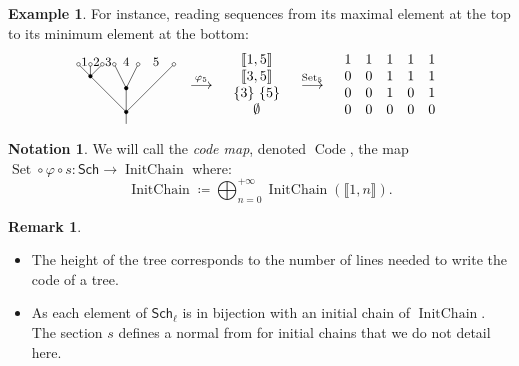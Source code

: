 \documentclass[a4paper,10pt]{amsart}
\DeclareMathOperator{\IC}{InitChain}
\DeclareMathOperator{\Code}{Code}
\DeclareMathOperator{\Set}{Set}
\newcommand\Sch{\mathsf{Sch}}
\newcommand\Schl{\mathsf{Sch}_\ell}
\newcommand{\IEM}[2]{\llbracket #1,#2 \rrbracket}
\theoremstyle{definition}
\newtheorem{exam}{Example}
\newtheorem{Not}{Notation}
\newtheorem{Rq}{Remark}
\begin{document}
\begin{exam}\label{Eg:tree_code}
	For instance, reading sequences from its maximal element at the top to its minimum element at the bottom:
	\begin{align}
		\raisebox{-0.5\height}{\begin{tikzpicture}[x=0.3cm, y=0.3cm]
				\draw (0,0)--(0,1);
				\draw (0,1)--(-4,5);
				\draw (0,1)--(4,5);
				\draw (0,1)--(0,3);
				\draw (0,3)--(-1,5);
				\draw (0,3)--(1,5);
				\draw (-3,4)--(-2,5);
				\draw (-3,4)--(-3,5);
				\filldraw (0,1) circle (0.15);
				\draw[ color=black, fill=white]  (-4,5) circle (0.15);
				\draw[ color=black, fill=white]  (-3,5) circle (0.15);
				\draw[ color=black, fill=white]  (-2,5) circle (0.15);
				\draw[ color=black, fill=white]  (-1,5) circle (0.15);
				\draw[ color=black, fill=white]  (4,5) circle (0.15);
				\draw[ color=black, fill=white]  (1,5) circle (0.15);
				\filldraw (-3,4) circle (0.15);
				\filldraw (0,3) circle (0.15);		
				\draw (-3.5, 5.2) node{\small{$1$}};
				\draw (-2.5, 5.2) node{\small{$2$}};
				\draw (-1.5,5.2) node{\small{$3$}};
				\draw (0, 5.2) node{\small{$4$}};
				\draw (2.5, 5.2) node{\small{$5$}};
		\end{tikzpicture}} && \overset{\varphi_5}{\longrightarrow} && \begin{array}{c}
			\IEM{1}{5} \\
			\IEM{3}{5} \\
			\{3\}~\{5\} \\
			\emptyset
		\end{array}
		&& \overset{\Set_5}{\longrightarrow} &&  \begin{array}{ccccc}
			1 & 1 & 1 & 1 & 1 \\
			0 & 0 & 1 & 1 & 1 \\
			0 & 0 & 1 & 0 & 1 \\
			0 & 0 & 0 & 0 & 0
		\end{array} 
	\end{align}
\end{exam}

\begin{Not}
	We will call the \emph{code map}, denoted $\Code$, the map $\Set\circ\varphi\circ s:\Sch\to \IC$ where:
	\[
	\IC \coloneqq \bigoplus_{n=0}^{+\infty} \IC(\IEM{1}{n}).
	\]
\end{Not}
\begin{Rq}
	\begin{itemize}
		\item The height of the tree corresponds to the number of lines needed to write the code of a tree. 
		\item As each element of $\Schl$ is in bijection with an initial chain of $\IC$. The section $s$ defines a normal from for initial chains that we do not detail here.
	\end{itemize}
	
\end{Rq}
\end{document}
